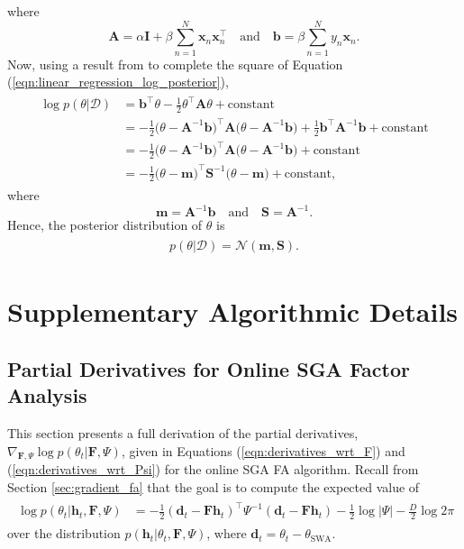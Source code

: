 \documentclass[msc,deptreport.inf]{infthesis} %
\newcommand{\matr}[1]{\mathbf{#1}}
\begin{document}
where 
\begin{equation}
	\matr{A} = \alpha \matr{I} + \beta \sum_{n=1}^N \matr{x}_n \matr{x}_n^\intercal
	\quad \text{and} \quad 
	\matr{b} = \beta \sum_{n=1}^N y_n \matr{x}_n.
\end{equation}
Now, using a result from \cite{barber2007} to complete the square of Equation (\ref{eqn:linear_regression_log_posterior}),
\begin{align}
\begin{split}
	\log p(\theta | \mathcal{D}) 
	& = \matr{b}^\intercal \theta 
	- \frac{1}{2} \theta^\intercal \matr{A} \theta 
	+ \text{constant} \\
	& = -\frac{1}{2} \big(\theta - \matr{A}^{-1} \matr{b} \big)^\intercal \matr{A} \big(\theta - \matr{A}^{-1} \matr{b} \big)
	+ \frac{1}{2} \matr{b}^\intercal \matr{A}^{-1} \matr{b}
	+ \text{constant} \\
	& = -\frac{1}{2} \big(\theta - \matr{A}^{-1} \matr{b} \big)^\intercal \matr{A} \big(\theta - \matr{A}^{-1} \matr{b} \big)
	+ \text{constant} \\
	& = -\frac{1}{2} \big(\theta - \matr{m} \big)^\intercal \matr{S}^{-1} \big(\theta - \matr{m} \big)
	+ \text{constant},
\end{split}
\end{align}
where
\begin{equation}
	\matr{m} = \matr{A}^{-1} \matr{b}
	\quad \text{and} \quad 
	\matr{S} = \matr{A}^{-1}.
\end{equation}
Hence, the posterior distribution of $\theta$ is 
\begin{align}
\begin{split}
	p(\theta | \mathcal{D}) = \mathcal{N}(\matr{m}, \matr{S}).
\end{split}
\end{align}

 \chapter{Supplementary Algorithmic Details}

\section{Partial Derivatives for Online SGA Factor Analysis}\label{app:online_fa_sga_derivatives}

This section presents a full derivation of the partial derivatives, $\nabla_{\matr{F}, \Psi} \log p(\theta_t | \matr{F}, \Psi)$, given in Equations (\ref{eqn:derivatives_wrt_F}) and (\ref{eqn:derivatives_wrt_Psi}) for the online SGA FA algorithm. Recall from Section \ref{sec:gradient_fa} that the goal is to compute the expected value of 
\begin{align}\label{eqn:log_fa_cond_dist_app}
\begin{split}
	\log p(\theta_t | \matr{h}_t, \matr{F}, \Psi)
	& = -\frac{1}{2} (\matr{d}_t - \matr{Fh}_t)^\intercal \Psi^{-1} (\matr{d}_t - \matr{Fh}_t) - \frac{1}{2} \log |\Psi| - \frac{D}{2} \log 2\pi
\end{split}
\end{align}
over the distribution $p(\matr{h}_t | \theta_t, \matr{F}, \Psi)$, where $\matr{d}_t = \theta_t - \theta_{\text{SWA}}$.
\end{document}

